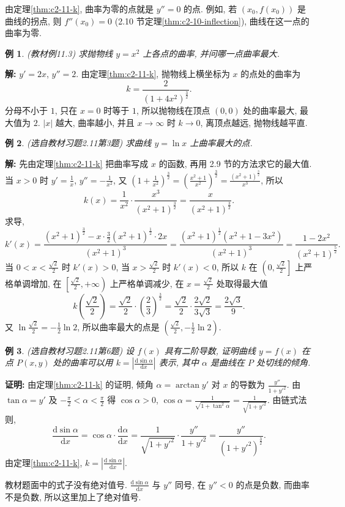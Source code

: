 \documentclass[UTF8,openany]{ctexbook}
\theoremstyle{chinesetextbook}
\newtheorem{example}{例}[section]
\newenvironment{cnproof}{\par\indent\textbf{证明:} \ignorespaces}{\par}
\newenvironment{cnsolution}{\par\indent\textbf{解:} \ignorespaces}{\par}
\newcommand{\dd}{\mathrm d}
\begin{document}
由定理\ref{thm:c2-11-k}, 曲率为零的点就是 $y''=0$ 的点. 例如, 若 $(x_0,f(x_0))$ 是曲线的拐点, 则 $f''(x_0)=0$ (2.10 节定理\ref{thm:c2-10-inflection}), 曲线在这一点的曲率为零.
\begin{example}\label{ex:c2-11-3}
\textnormal{(教材例11.3)} 求抛物线 $y=x^2$ 上各点的曲率, 并问哪一点曲率最大.
\end{example}
\begin{cnsolution}
$y'=2x$, $y''=2$. 由定理\ref{thm:c2-11-k}, 抛物线上横坐标为 $x$ 的点处的曲率为
\[
k=\frac2{(1+4x^2)^{\frac32}}.
\]
分母不小于 $1$, 只在 $x=0$ 时等于 $1$, 所以抛物线在顶点 $(0,0)$ 处的曲率最大, 最大值为 $2$. $|x|$ 越大, 曲率越小, 并且 $x\to\infty$ 时 $k\to0$, 离顶点越远, 抛物线越平直.
\end{cnsolution}
\begin{example}\label{ex:c2-h11-3}
\textnormal{(选自教材习题2.11第3题)} 求曲线 $y=\ln x$ 上曲率最大的点.
\end{example}
\begin{cnsolution}
先由定理\ref{thm:c2-11-k} 把曲率写成 $x$ 的函数, 再用 2.9 节的方法求它的最大值. 当 $x>0$ 时 $\displaystyle y'=\frac1x$, $\displaystyle y''=-\frac1{x^2}$, 又 $\displaystyle\left(1+\frac1{x^2}\right)^{\frac32}=\left(\frac{x^2+1}{x^2}\right)^{\frac32}=\frac{(x^2+1)^{\frac32}}{x^3}$, 所以
\[
k(x)=\frac1{x^2}\cdot\frac{x^3}{(x^2+1)^{\frac32}}=\frac x{(x^2+1)^{\frac32}}.
\]
求导,
\[
k'(x)=\frac{(x^2+1)^{\frac32}-x\cdot\frac32(x^2+1)^{\frac12}\cdot2x}{(x^2+1)^3}=\frac{(x^2+1)^{\frac12}(x^2+1-3x^2)}{(x^2+1)^3}=\frac{1-2x^2}{(x^2+1)^{\frac52}}.
\]
当 $\displaystyle0<x<\frac{\sqrt2}2$ 时 $k'(x)>0$, 当 $\displaystyle x>\frac{\sqrt2}2$ 时 $k'(x)<0$, 所以 $k$ 在 $\displaystyle\left(0,\frac{\sqrt2}2\right]$ 上严格单调增加, 在 $\displaystyle\left[\frac{\sqrt2}2,+\infty\right)$ 上严格单调减少, 在 $\displaystyle x=\frac{\sqrt2}2$ 处取得最大值
\[
k\left(\frac{\sqrt2}2\right)=\frac{\sqrt2}2\cdot\left(\frac23\right)^{\frac32}=\frac{\sqrt2}2\cdot\frac{2\sqrt2}{3\sqrt3}=\frac{2\sqrt3}9.
\]
又 $\displaystyle\ln\frac{\sqrt2}2=-\frac12\ln2$, 所以曲率最大的点是 $\displaystyle\left(\frac{\sqrt2}2,-\frac12\ln2\right)$.
\end{cnsolution}
\begin{example}\label{ex:c2-h11-6}
\textnormal{(选自教材习题2.11第6题)} 设 $f(x)$ 具有二阶导数, 证明曲线 $y=f(x)$ 在点 $P(x,y)$ 处的曲率可以用 $\displaystyle k=\left|\frac{\dd\sin\alpha}{\dd x}\right|$ 表示, 其中 $\alpha$ 是曲线在 $P$ 处切线的倾角.
\end{example}
\begin{cnproof}
由定理\ref{thm:c2-11-k} 的证明, 倾角 $\alpha=\arctan y'$ 对 $x$ 的导数为 $\displaystyle\frac{y''}{1+y'^2}$. 由 $\tan\alpha=y'$ 及 $\displaystyle-\frac\pi2<\alpha<\frac\pi2$ 得 $\cos\alpha>0$, $\displaystyle\cos\alpha=\frac1{\sqrt{1+\tan^2\alpha}}=\frac1{\sqrt{1+y'^2}}$. 由链式法则,
\[
\frac{\dd\sin\alpha}{\dd x}=\cos\alpha\cdot\frac{\dd\alpha}{\dd x}=\frac1{\sqrt{1+y'^2}}\cdot\frac{y''}{1+y'^2}=\frac{y''}{(1+y'^2)^{\frac32}}.
\]
由定理\ref{thm:c2-11-k}, $\displaystyle k=\left|\frac{\dd\sin\alpha}{\dd x}\right|$.

教材题面中的式子没有绝对值号. $\displaystyle\frac{\dd\sin\alpha}{\dd x}$ 与 $y''$ 同号, 在 $y''<0$ 的点是负数, 而曲率不是负数, 所以这里加上了绝对值号.
\end{cnproof}
\end{document}

